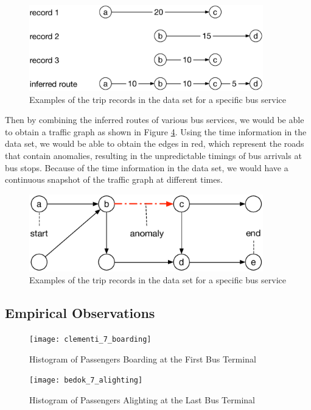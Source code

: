 \documentclass[10pt]{article}
\begin{document}
\begin{figure}[htb]
	\centering
	\includegraphics[width=4.0in]{trip_example}
	\caption{Examples of the trip records in the data set for a specific bus service}
	\label{fig:trip_example}
\end{figure}

Then by combining the inferred routes of various bus services, we would be able to obtain a traffic graph as shown in Figure \ref{fig:travel_graph}. Using the time information in the data set, we would be able to obtain the edges in red, which represent the roads that contain anomalies, resulting in the unpredictable timings of bus arrivals at bus stops. Because of the time information in the data set, we would have a continuous snapshot of the traffic graph at different times.

\begin{figure}[htb]
	\centering
	\includegraphics[width=4.0in]{travel_graph}
	\caption{Examples of the trip records in the data set for a specific bus service}
	\label{fig:travel_graph}
\end{figure}

\subsection{Empirical Observations}

\begin{figure}[htb]
	\centering
	\texttt{[image: clementi\_7\_boarding]}
	\caption{Histogram of Passengers Boarding at the First Bus Terminal}
	\label{fig:travel_graph}
\end{figure}

\begin{figure}[htb]
	\centering
	\texttt{[image: bedok\_7\_alighting]}
	\caption{Histogram of Passengers Alighting at the Last Bus Terminal}
	\label{fig:travel_graph}
\end{figure}
\end{document}
